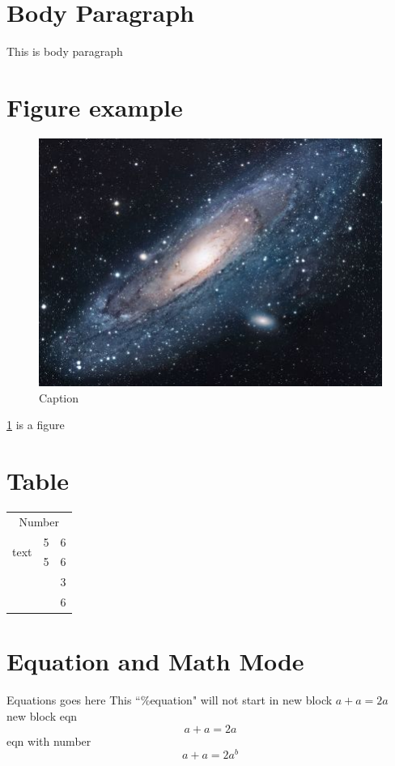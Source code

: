 \documentclass[18pt,a4paper]{article}
\begin{document}
\section*{Body Paragraph}
This is body paragraph
\section{Figure example}
\begin{figure}[h]
    \centering
    \includegraphics{universe.jpg}
    \caption{Caption}
    \label{fig:fig_1}
\end{figure}

\ref{fig:fig_1} is a figure
\section{Table}
\begin{tabular}{|c|c|c|}
    \hline
    
    \multicolumn{3}{|c|}{Number}  \\
    \cline{2-2}
    \multirow{2}{*}{text} &5 & 6\\
    \cline{2-3}
     & 5 & 6\\
    \hline
    \multicolumn{2}{|c|}{ \multirow{2}{*}{2x2} }& 3 \\
    \cline{3-3}
    \multicolumn{2}{|c|}{ }& 6 \\
    \hline
    
\end{tabular}

\section{Equation and Math Mode}
Equations goes here
\newline
This ``\%equation" will not start in new block $a+a = 2a$\\
new block eqn $$ a+a = 2a $$
eqn with number
\begin{equation}
    a+a = 2a^b
\end{equation}
\end{document}
